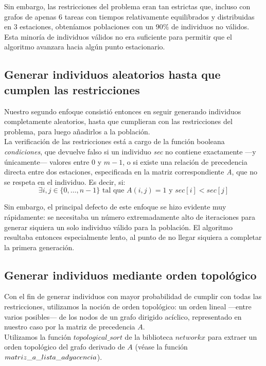 \documentclass[12pt]{report}
\begin{document}
Sin embargo, las restricciones del problema eran tan estrictas que, incluso con grafos de apenas $6$ tareas con tiempos relativamente equilibrados y distribuidas en $3$ estaciones, obteníamos poblaciones con un $90\%$ de individuos no válidos.
Esta minoría de individuos válidos no era suficiente para permitir que el algoritmo avanzara hacia algún punto estacionario.

\subsection*{Generar individuos aleatorios hasta que cumplen las restricciones}

Nuestro segundo enfoque consistió entonces en seguir generando individuos completamente aleatorios, hasta que cumplieran con las restricciones del problema, para luego añadirlos a la población.\\

La verificación de las restricciones está a cargo de la función booleana \textit{condiciones}, que devuelve falso si un individuo \textit{sec} no contiene exactamente —y únicamente— valores entre $0$ y $m-1$, o si existe una relación de precedencia directa entre dos estaciones, especificada en la matriz correspondiente \textit{A}, que no se respeta en el individuo. Es decir, si:
\[
\exists i,j \in \{0,\dots,n-1\} \text{ tal que } A(i,j) = 1 \text{ y } sec[i] < sec[j]
\]

Sin embargo, el principal defecto de este enfoque se hizo evidente muy rápidamente: se necesitaba un número extremadamente alto de iteraciones para generar siquiera un solo individuo válido para la población.
El algoritmo resultaba entonces especialmente lento, al punto de no llegar siquiera a completar la primera generación.

\subsection*{Generar individuos mediante orden topológico}

Con el fin de generar individuos con mayor probabilidad de cumplir con todas las restricciones, utilizamos la noción de orden topológico: un orden lineal —entre varios posibles— de los nodos de un grafo dirigido acíclico, representado en nuestro caso por la matriz de precedencia $A$. \\
Utilizamos la función $topological\_sort$ de la biblioteca $networkx$ para extraer un orden topológico del grafo derivado de $A$ (véase la función $matriz\_a\_ \\ lista\_adyacencia$).\\
\end{document}
